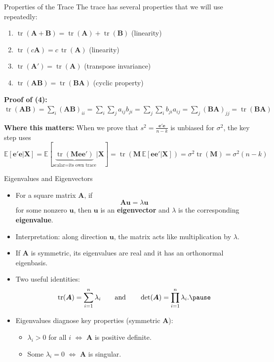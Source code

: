\documentclass[aspectratio=169, handout, t]{beamer}
\DeclareMathOperator{\tr}{tr}
\numberwithin{equation}{section}
\begin{document}
\begin{frame}{Properties of the Trace}
The trace has several properties that we will use repeatedly:
\begin{enumerate}
\item $\tr(\bm{A}+\bm{B})=\tr(\bm{A})+\tr(\bm{B})$ \hfill (linearity)
\item $\tr(c\bm{A})=c\,\tr(\bm{A})$ \hfill (linearity)
\item $\tr(\bm{A}'\!)=\tr(\bm{A})$ \hfill (transpose invariance)
\item $\tr(\bm{A}\bm{B})=\tr(\bm{B}\bm{A})$ \hfill (cyclic property)
\end{enumerate}\pause
\bigskip
\textbf{Proof of (4):}
$\displaystyle\tr(\bm{A}\bm{B})=\sum_i(\bm{A}\bm{B})_{ii}=\sum_i\sum_j a_{ij}b_{ji}=\sum_j\sum_i b_{ji}a_{ij}=\sum_j(\bm{B}\bm{A})_{jj}=\tr(\bm{B}\bm{A})$
\bigskip\pause

\textbf{Where this matters:} When we prove that $s^2=\frac{\bm{e}'\bm{e}}{n-k}$ is unbiased for $\sigma^2$, the key step uses
$$\mathbb{E}[\bm{e}'\bm{e}|\bm{X}]=\mathbb{E}[\underbrace{\tr(\bm{M}\bm{e}\bm{e}')}_{\text{scalar}=\text{its own trace}}|\bm{X}]=\tr(\bm{M}\,\mathbb{E}[\bm{e}\bm{e}'|\bm{X}])=\sigma^2\tr(\bm{M})=\sigma^2(n-k)$$
\end{frame}


\begin{frame}{Eigenvalues and Eigenvectors}

\begin{itemize}
\item For a square matrix $\bm{A}$, if
\[
\bm{A}\bm{u}=\lambda\bm{u}
\]
for some nonzero $\bm{u}$, then $\bm{u}$ is an \textbf{eigenvector} and $\lambda$ is the corresponding \textbf{eigenvalue}.\pause

\item Interpretation: along direction $\bm{u}$, the matrix acts like multiplication by $\lambda$.\pause

\item If $\bm{A}$ is symmetric, its eigenvalues are real and it has an orthonormal eigenbasis.\pause

\item Two useful identities:
\[
\tr(\bm{A})=\sum_{i=1}^n \lambda_i
\qquad\text{and}\qquad
\det(\bm{A})=\prod_{i=1}^n \lambda_i.\pause
\]

\item Eigenvalues diagnose key properties (symmetric $\bm{A}$):
\begin{itemize}
    \item $\lambda_i>0$ for all $i$ $\iff$ $\bm{A}$ is positive definite.
    \item Some $\lambda_i=0$ $\iff$ $\bm{A}$ is singular.
\end{itemize}

\end{itemize}

\end{frame}
\end{document}
